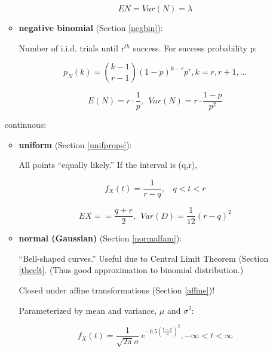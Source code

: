 \begin{itemize}
\begin{itemize}
   \begin{equation}
   EN = Var(N) = \lambda
   \end{equation}

   \item {\bf negative binomial} (Section \ref{negbin}):

   Number of i.i.d. trials until r$^{th}$ success.  For success
   probability p: 

   \begin{equation}
   p_N(k) =  \binom{k-1}{r-1} (1-p)^{k-r} p^r, k = r, r+1, ...
   \end{equation}

   \begin{equation}
   E(N) = r \cdot \frac{1}{p}, ~~ Var(N) = r \cdot \frac{1-p}{p^2}
   \end{equation}

   \end{itemize}

continuous:

   \begin{itemize}

   \item {\bf uniform} (Section \ref{unifprops}):

   All points ``equally likely.''  If the interval is (q,r),

   \begin{equation}
   f_X(t) = \frac{1}{r-q}, ~~~~ q < t < r
   \end{equation}

   \begin{equation}
   EX = = \frac{q+r}{2}, ~~ Var(D) = \frac{1}{12} (r-q)^2
   \end{equation}

   \item {\bf normal (Gaussian)} (Section \ref{normalfam}):

   ``Bell-shaped curves.''  Useful due to Central Limit Theorem (Section
   \ref{theclt}.  (Thus good approximation to binomial distribution.)

   Closed under affine transformations (Section \ref{affine})!

   Parameterized by mean and variance, $\mu$ and $\sigma^2$:

   \begin{equation}
   f_X(t) =  \frac{1}{\sqrt{2\pi} \sigma} 
   ~ e^{- 0.5 \left (\frac{t-\mu}{\sigma} \right )^2}, -\infty < t < \infty
   \end{equation}


\end{itemize}
\end{itemize}
